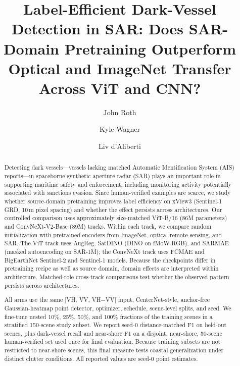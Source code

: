 \documentclass[runningheads]{llncs}
\begin{document}
\title{Label-Efficient Dark-Vessel Detection in SAR: Does SAR-Domain
Pretraining Outperform Optical and ImageNet Transfer Across ViT and CNN?}

\author{John Roth \and Kyle Wagner \and Liv d'Aliberti}


\maketitle

\begin{abstract}
Detecting dark vessels---vessels lacking matched Automatic Identification
System (AIS) reports---in spaceborne synthetic aperture radar (SAR) plays an important role in supporting
maritime safety and enforcement, including monitoring activity potentially associated with sanctions evasion. 
Since human-verified examples are scarce, we study whether source-domain pretraining improves label efficiency on
xView3 (Sentinel-1 GRD, 10\,m pixel spacing) and whether the effect persists
across architectures. Our controlled comparison uses approximately
size-matched ViT-B/16 (86M parameters) and ConvNeXt-V2-Base (89M) tracks.
Within each track, we compare random initialization with
pretrained encoders from ImageNet, optical remote sensing, and SAR. The ViT
track uses AugReg, SatDINO (DINO on fMoW-RGB), and SARMAE (masked autoencoding
on SAR-1M); the ConvNeXt track uses FCMAE and BigEarthNet Sentinel-2 and Sentinel-1
models. Because the
checkpoints differ in pretraining recipe as well as source domain, domain
effects are interpreted within architecture. Matched-role cross-track
comparisons test whether the observed pattern persists across architectures.

All arms use the same [VH, VV, VH$-$VV] input, CenterNet-style, anchor-free Gaussian-heatmap point detector,
optimizer, schedule, scene-level splits, and seed. We fine-tune nested 10\%,
25\%, 50\%, and 100\% fractions of the training scenes in a stratified
150-scene study subset. We report seed-0 distance-matched F1 on held-out
scenes, plus dark-vessel recall and near-shore F1 on a disjoint, near-shore,
50-scene human-verified set used once for final evaluation. Because training
subsets are not restricted to near-shore scenes, this final measure tests
coastal generalization under distinct clutter conditions. All reported values are seed-0 point estimates.

\end{abstract}
\end{document}
